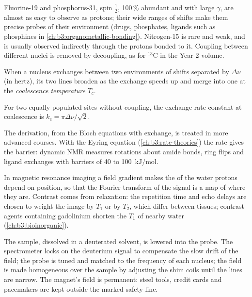 Fluorine-19 and phosphorus-31, spin $\frac12$, 100\,\% abundant and with large
$\gamma$, are almost as easy to observe as protons; their wide ranges of shifts make
them precise probes of their environment (drugs, phosphates, ligands such as
phosphines in \cref{ch:b3:organometallic-bonding}). Nitrogen-15 is rare and
weak, and is usually observed indirectly through the protons bonded to it.
Coupling between different nuclei is removed by decoupling, as for ${}^{13}$C in
the Year 2 volume.

\begin{definition}\label{def:b3:advanced-nmr:coalescence}
When a nucleus exchanges between two environments of shifts separated by
$\Delta\nu$ (in hertz), its two lines broaden as the exchange speeds up and merge
into one at the \emph{coalescence temperature}
$T_c$.
\end{definition}

\begin{proposition}\label{prop:b3:advanced-nmr:coalescence}
For two equally populated sites without coupling, the exchange rate constant at
coalescence is $k_c = \pi\Delta\nu/\sqrt2$.
\end{proposition}
\admitted

The derivation, from the Bloch equations with exchange, is treated in more
advanced courses. With the Eyring equation (\cref{ch:b3:rate-theories}) the rate
gives the barrier: dynamic NMR measures rotations about amide bonds, ring
flips and ligand exchanges with barriers of 40 to \qty{100}{kJ/mol}.

\begin{example}\label{ex:b3:advanced-nmr:mri}
In magnetic resonance imaging a field gradient makes the  of
the water protons depend on position, so that the Fourier transform of the
signal is a map of where they are. Contrast comes from relaxation: the
repetition time and echo delays are chosen to weight the image by $T_1$ or by
$T_2$, which differ between tissues; contrast agents containing gadolinium
shorten the $T_1$ of nearby water (\cref{ch:b3:bioinorganic}).
\end{example}

\begin{inthelab}
The sample, dissolved in a deuterated solvent, is lowered into the probe.
The spectrometer locks on the deuterium signal to compensate the slow drift of
the field; the probe is tuned and matched to the frequency of each nucleus;
the field is made homogeneous over the sample by adjusting the shim coils
until the lines are narrow. The magnet's field is permanent: steel tools,
credit cards and pacemakers are kept outside the marked safety line.
\end{inthelab}

